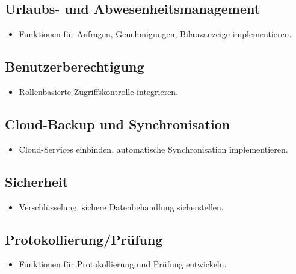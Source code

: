 \documentclass[../main.tex]{subfiles}
\begin{document}
\subsection{Urlaubs- und Abwesenheitsmanagement}
\begin{itemize}
  \item Funktionen für Anfragen, Genehmigungen, Bilanzanzeige implementieren.
\end{itemize}

\subsection{Benutzerberechtigung}
\begin{itemize}
  \item Rollenbasierte Zugriffskontrolle integrieren.
\end{itemize}

\subsection{Cloud-Backup und Synchronisation}
\begin{itemize}
  \item Cloud-Services einbinden, automatische Synchronisation implementieren.
\end{itemize}

\subsection{Sicherheit}
\begin{itemize}
  \item Verschlüsselung, sichere Datenbehandlung sicherstellen.
\end{itemize}

\subsection{Protokollierung/Prüfung}
\begin{itemize}
  \item Funktionen für Protokollierung und Prüfung entwickeln.
\end{itemize}
\end{document}
